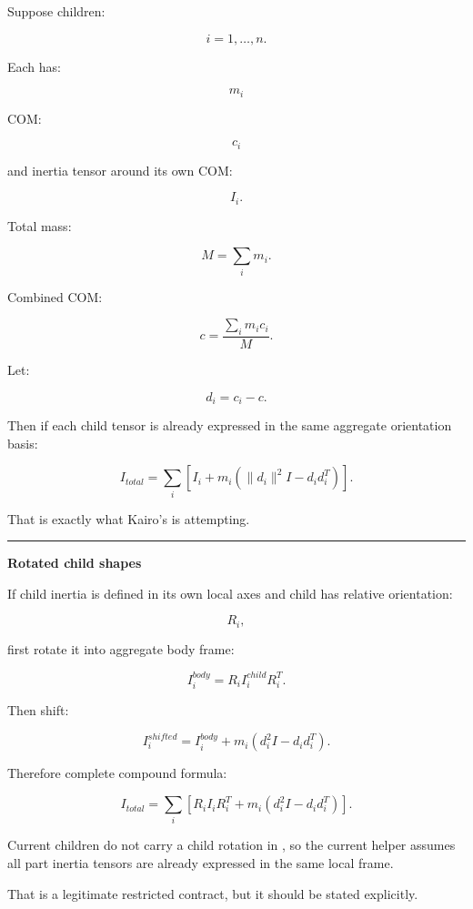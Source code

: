 \hypertarget{06-engine-ii-ch035-part-1637-composite-body-mass-properties}{}

Suppose children:

\[
i=1,\dots,n.
\]

Each has:

\[
m_i
\]

COM:

\[
c_i
\]

and inertia tensor around its own COM:

\[
I_i.
\]

Total mass:

\[
\boxed{
M=\sum_i m_i.
}
\]

Combined COM:

\[
\boxed{
c=
\frac{
\sum_i m_ic_i
}{
M
}.
}
\]

Let:

\[
d_i=c_i-c.
\]

Then if each child tensor is already expressed in the same aggregate orientation basis:

\[
\boxed{
I_{total}
=
\sum_i
\left[
I_i+
m_i
(
\|d_i\|^2I-d_id_i^T
)
\right].
}
\]

That is exactly what Kairo's  is attempting.

\begin{center}\rule{0.5\linewidth}{0.5pt}\end{center}

\textbf{Rotated child shapes}

If child inertia is defined in its own local axes and child has relative orientation:

\[
R_i,
\]

first rotate it into aggregate body frame:

\[
I_i^{body}
=
R_i
I_i^{child}
R_i^T.
\]

Then shift:

\[
I_i^{shifted}
=
I_i^{body}
+
m_i
(
d_i^2I-d_id_i^T
).
\]

Therefore complete compound formula:

\[
\boxed{
I_{total}
=
\sum_i
\left[
R_iI_iR_i^T
+
m_i
(
d_i^2I-d_id_i^T
)
\right].
}
\]

Current  children do not carry a child rotation in , so the current helper assumes all part inertia tensors are already expressed in the same local frame.

That is a legitimate restricted contract, but it should be stated explicitly.

